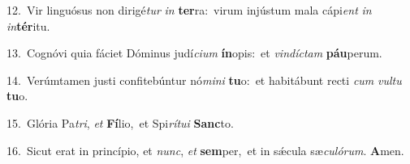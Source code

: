 {\numbfont\textcolor{\numbcolor}{12.}}~Vir linguósus non dirigé\textit{tur} \textit{in} \textbf{ter}\-ra:~\star virum injústum mala cápi\textit{ent} \textit{in} \textit{in}\-\textbf{tér}itu.\par
{\numbfont\textcolor{\numbcolor}{13.}}~Cognóvi quia fáciet Dóminus judí\-\textit{ci}\-\textit{um} \textbf{ín}\-opis:~\star et \textit{vin}\-\textit{díc}\textit{tam} \textbf{páu}\-perum.\par
{\numbfont\textcolor{\numbcolor}{14.}}~Verúmtamen justi confitebúntur nó\-\textit{mi}\-\textit{ni} \textbf{tu}\-o:~\star et habitábunt recti \textit{cum} \textit{vul}\-\textit{tu} \textbf{tu}\-o.\par
{\numbfont\textcolor{\numbcolor}{15.}}~Glória Pa\-\textit{tri}\-, \textit{et} \textbf{Fí}\-lio,~\star et Spi\-\textit{rí}\-\textit{tu}\textit{i} \textbf{Sanc}\-to.\par
{\numbfont\textcolor{\numbcolor}{16.}}~Sicut erat in princípio, et \textit{nunc}\-, \textit{et} \textbf{sem}\-per,~\star et in sǽcula sæ\-\textit{cu}\-\textit{ló}\textit{rum}. \textbf{A}\-men.\par
